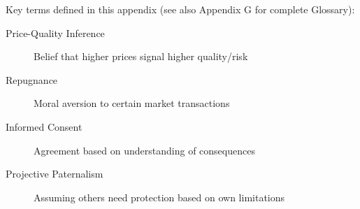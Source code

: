 \begin{abstract}
This appendix integrates Sandro Ambühl's research on belief updating, organ markets, and informed consent into the Evidence-Based Framework. Ambühl's work reveals how introducing market prices for organs systematically changes people's beliefs about health consequences---people infer that paid donation must be more harmful, even without new medical information. His research on informed consent demonstrates that comprehension is often poor and that paternalistic interventions can be welfare-enhancing when people don't understand what they're agreeing to. This appendix provides critical parameters for CORE-AWARE and establishes boundary conditions for when market mechanisms help versus harm.
\end{abstract}

\begin{tcolorbox}[colback=gray!10!white,colframe=gray!50!black,title=Quick Reference]
Key terms defined in this appendix (see also Appendix G for complete Glossary):
\begin{description}
    \item[Price-Quality Inference] Belief that higher prices signal higher quality/risk
    \item[Repugnance] Moral aversion to certain market transactions
    \item[Informed Consent] Agreement based on understanding of consequences
    \item[Projective Paternalism] Assuming others need protection based on own limitations
\end{description}
\end{tcolorbox}


